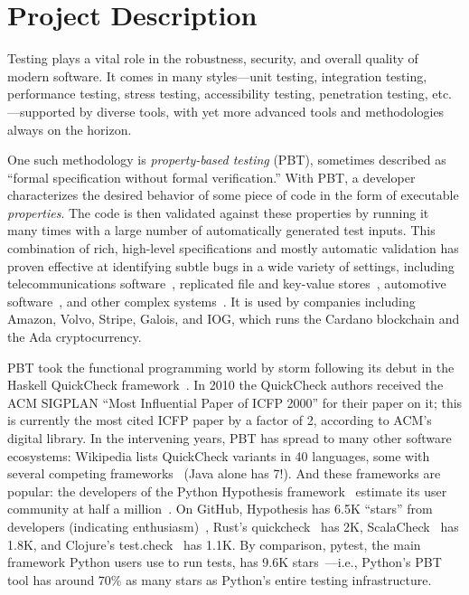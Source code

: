 \section*{Project Description}

Testing plays a vital role in the robustness, security, and overall
quality of modern software. It comes in many styles---unit testing,
integration testing, performance testing, stress testing,
accessibility testing, penetration testing, etc.---supported by
diverse tools, with yet more advanced tools and methodologies always on
the horizon.

One such methodology is {\em property-based testing} (PBT),
sometimes described as ``formal specification without formal
verification.''  With PBT, a developer characterizes the desired
behavior of
some piece of code in the form of executable {\em
  properties}. The code is
then validated against these properties by running it many times
with a large number of automatically generated test
inputs.
%
%
This combination of rich, high-level specifications and mostly
automatic validation has proven effective at identifying
subtle bugs in a wide variety of settings, including
telecommunications software~\cite{arts2006testing}, replicated
file and key-value
stores~\cite{MysteriesOfDropbox2016,Bornholt2021}, automotive
software~\cite{arts2015testing}, and other complex
systems~\cite{hughes2016experiences}.
It is used by companies including Amazon, Volvo, Stripe, Galois,
and IOG, which
runs the Cardano blockchain and the Ada cryptocurrency.

PBT took the functional programming world by storm following its
debut in the Haskell QuickCheck framework~\cite{ClaessenHughes00}.  In
2010 the
QuickCheck authors received the ACM SIGPLAN ``Most Influential Paper of ICFP
2000'' for their paper on it; this is currently the most cited
ICFP paper by
a factor of 2, according to ACM's digital library.  In the intervening
years, PBT has spread to many other software ecosystems:
%
Wikipedia lists QuickCheck variants in 40  languages, some
with several competing frameworks~\cite{QuickCheckWikipedia} (Java alone has
7!).
%
And these frameworks are popular:
the developers of the Python Hypothesis framework~\cite{maciver2019hypothesis,HypothesisGithub} estimate its user community
at half a million~\cite{ZacPersonalCommunication,noauthor_python_nodate}.  On GitHub,
Hypothesis has 6.5K ``stars'' from developers (indicating enthusiasm)~\cite{borges_whats_2018}, Rust's
quickcheck~\cite{RustQuickcheckGithub} has 2K,
ScalaCheck~\cite{ScalaCheckGithub} has 1.8K, and Clojure's
test.check~\cite{ClojureTest.checkGithub} has 1.1K.
By comparison, pytest, the main framework Python users use to run
tests, has 9.6K stars~\cite{PytestGitHub}---i.e., Python's
PBT tool has around 70\% as many stars as Python's entire testing
infrastructure.

